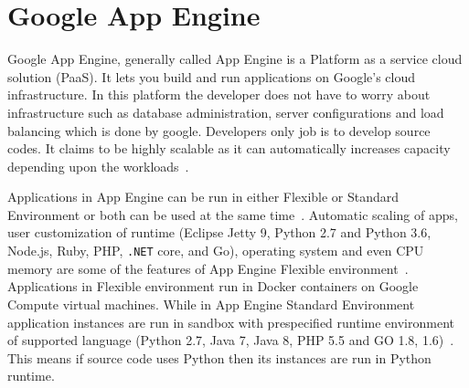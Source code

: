 \section{Google App Engine}

Google App Engine, generally called App Engine is a Platform as a service cloud 
solution (PaaS). It lets you build and run applications on Google’s cloud 
infrastructure. In this platform the developer does not have to worry about 
infrastructure such as database administration, server configurations and 
load balancing which is done by google. Developers only job is to develop 
source codes.  It claims to be highly scalable as it can automatically 
increases capacity depending upon the
workloads~\cite{hid-sp18-415-www-scalabitity}.
 
Applications in App Engine can be run in either Flexible or Standard Environment or 
both can be used at the same time~\cite{hid-sp18-415-www-cloud-goggle}. 
Automatic scaling of apps, user customization of runtime (Eclipse Jetty 9, 
Python 2.7 and Python 3.6, Node.js, Ruby, PHP, \verb|.NET| core, and Go), operating 
system and even CPU memory  are some of the features of App Engine Flexible 
environment~\cite{hid-sp18-415-www-cloud-goggle}. Applications in Flexible 
environment run in Docker containers on Google Compute virtual machines. While 
in App Engine Standard Environment application instances are run in sandbox with 
prespecified runtime environment of supported language (Python 2.7, Java 7, 
Java 8, PHP 5.5 and GO 1.8,  1.6)~\cite{hid-sp18-415-app-engine}. 
This means if source code uses Python then its instances are run in Python runtime. 
